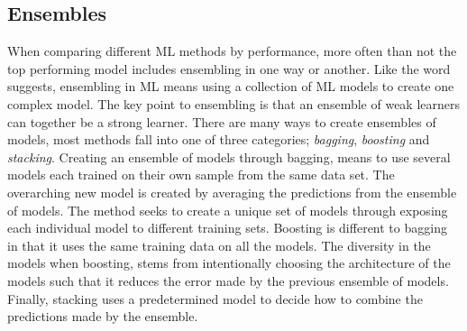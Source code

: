 \subsection{Ensembles}\label{subsec:Ensembles}
When comparing different \ac{ML} methods by performance, more often than not the top performing model includes 
ensembling in one way or another. Like the word suggests, ensembling in \ac{ML} means using a collection of 
\ac{ML} models to create one complex model. The key point to ensembling is that an ensemble of weak learners 
can together be a strong learner. There are many ways to create ensembles of models, most methods 
fall into one of three categories; \emph{bagging}, \emph{boosting} and \emph{stacking}. Creating an ensemble of models 
through bagging, means to use several models each trained on their own sample from the same data set. The overarching 
new model is created by averaging the predictions from the ensemble of models. The method seeks to create a unique set of 
models through exposing each individual model to different training sets. Boosting is different to bagging in that it uses 
the same training data on all the models. The diversity in the models when boosting, stems from intentionally choosing the 
architecture of the models such that it reduces the error made by the previous ensemble of models. Finally, stacking uses 
a predetermined model to decide how to combine the predictions made by the ensemble. 